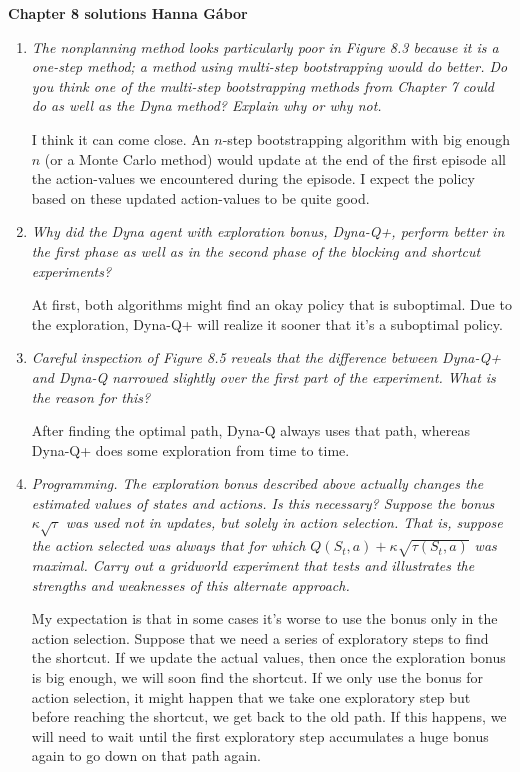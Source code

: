\documentclass[12pt,a4paper]{article}
\begin{document}
\textbf{Chapter 8 solutions  \hfill Hanna Gábor}

\begin{enumerate}
  \item
    \textit{The nonplanning method looks particularly poor in Figure 8.3 because it is
    a one-step method; a method using multi-step bootstrapping would do better. Do you
    think one of the multi-step bootstrapping methods from Chapter 7 could do as well as
    the Dyna method? Explain why or why not.}

    I think it can come close. An $n$-step bootstrapping algorithm with big enough $n$ (or a
    Monte Carlo method) would update at the end of the first episode all the action-values we
    encountered during the episode.
    I expect the policy based on these updated action-values to be quite good.

  \item
    \textit{Why did the Dyna agent with exploration bonus, Dyna-Q+, perform
    better in the first phase as well as in the second phase of the blocking and shortcut
    experiments?}

    At first, both algorithms might find an okay policy that is suboptimal. Due
    to the exploration, Dyna-Q+ will realize it sooner that it's a suboptimal policy.

  \item
    \textit{Careful inspection of Figure 8.5 reveals that the difference between Dyna-Q+
    and Dyna-Q narrowed slightly over the first part of the experiment. What is the reason
    for this?}

    After finding the optimal path, Dyna-Q always uses that path, whereas Dyna-Q+
    does some exploration from time to time.

  \item
    \textit{Programming. The exploration bonus described above actually changes
    the estimated values of states and actions. Is this necessary? Suppose the bonus
    $\kappa \sqrt{\tau}$ was used not in updates, but solely in action selection.
    That is, suppose the action selected was always that for which $Q(S_t, a) +
    \kappa \sqrt{\tau (S_t, a)}$ was maximal. Carry out a gridworld experiment
    that tests and illustrates the strengths and weaknesses of this alternate approach.}

    My expectation is that in some cases it's worse to use the bonus only in the
    action selection. Suppose that we need a series of exploratory steps to find
    the shortcut. If we update the actual values, then once the exploration bonus
    is big enough, we will soon find the shortcut. If we only use the bonus for action
    selection, it might happen that we take one exploratory step but before reaching the
    shortcut, we get back to the old path. If this happens, we will need to wait until
    the first exploratory step accumulates a huge bonus again to go down on that
    path again.


\end{enumerate}
\end{document}
